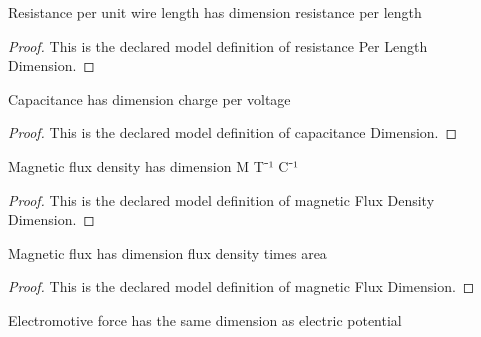 \begin{definition}
  \label{def:physics:phyx-mini-0978:phyxminiproblems-problemphyxmini0978-resistanceperlengthdimension}
  Resistance per unit wire length has dimension resistance per length
\end{definition}
\begin{proof}
  This is the declared model definition of resistance Per Length Dimension.
\end{proof}
\begin{definition}
  \label{def:physics:phyx-mini-0978:phyxminiproblems-problemphyxmini0978-capacitancedimension}
  Capacitance has dimension charge per voltage
\end{definition}
\begin{proof}
  This is the declared model definition of capacitance Dimension.
\end{proof}
\begin{definition}
  \label{def:physics:phyx-mini-0978:phyxminiproblems-problemphyxmini0978-magneticfluxdensitydimension}
  Magnetic flux density has dimension M T⁻¹ C⁻¹
\end{definition}
\begin{proof}
  This is the declared model definition of magnetic Flux Density Dimension.
\end{proof}
\begin{definition}
  \label{def:physics:phyx-mini-0978:phyxminiproblems-problemphyxmini0978-magneticfluxdimension}
  Magnetic flux has dimension flux density times area
\end{definition}
\begin{proof}
  This is the declared model definition of magnetic Flux Dimension.
\end{proof}
\begin{definition}
  \label{def:physics:phyx-mini-0978:phyxminiproblems-problemphyxmini0978-electromotiveforcedimension}
  Electromotive force has the same dimension as electric potential
\end{definition}
